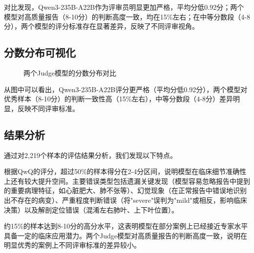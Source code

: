 \documentclass[12pt,a4paper]{article}
\begin{document}
对比发现，Qwen3-235B-A22B作为评审员明显更加严格，平均分低0.92分；两个模型对高质量报告（8-10分）的判断高度一致，均在15\%左右；在中等分数段（4-8分），两个模型的评分标准存在显著差异，反映了不同评审视角。

\subsection{分数分布可视化}

\begin{figure}[h]
\centering
{}
\caption{两个Judge模型的分数分布对比}
\end{figure}

从图中可以看出，Qwen3-235B-A22B评分更严格（平均分低0.92分），两个模型对优秀样本（8-10分）的判断一致性高（15\%左右），中等分数段（4-8分）差异明显，反映不同评审标准。

\subsection{结果分析}

通过对2,219个样本的评估结果分析，我们发现以下特点。

根据QwQ的评分，超过50\%的样本得分在2-4分区间，说明模型在临床细节准确性上还有较大提升空间。主要错误类型包括遗漏关键发现（模型容易忽略报告中提到的重要病理特征，如心脏肥大、肺不张等）、幻觉现象（在正常报告中错误地识别出不存在的病变）、严重程度判断错误（将"severe"误判为"mild"或相反，影响临床决策）以及解剖定位错误（混淆左右肺叶、上下叶位置）。

约15\%的样本达到8-10分的高分水平，这表明模型在部分案例上已经接近专家水平具备一定的临床应用潜力。两个Judge模型对高质量报告的判断高度一致，说明在明显优秀的案例上不同评审标准的差异较小。
\end{document}
